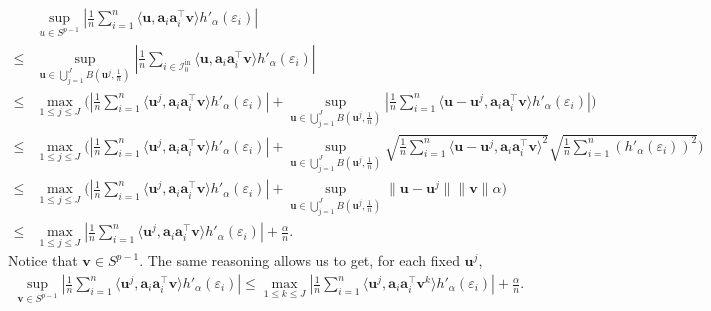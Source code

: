 \documentclass{article}
\numberwithin{equation}{section}
\begin{document}
\begin{equation}
	\begin{aligned}
		&\sup_{u\in S^{p-1}}|\frac{1}{n}\sum_{i=1}^n \langle \mathbf{u}, \mathbf{a}_i\mathbf{a}_i^\top\mathbf{v}\rangle h'_{\alpha}(\varepsilon_i)| \\
		\leq&\sup_{\mathbf{u}\in\bigcup_{j=1}^{J}B\left( \mathbf{u}^j,\frac{1}{n}\right)}|\frac{1}{n}\sum_{i\in\mathcal{I}_{0}^{\mathrm{in}}}\langle \mathbf{u}, \mathbf{a}_i\mathbf{a}_i^\top\mathbf{v}\rangle h'_{\alpha}(\varepsilon_i)| \\
		\leq&\max_{1\leq j\leq J}\Big(|\frac{1}{n}\sum_{i=1}^n \langle \mathbf{u}^j, \mathbf{a}_i\mathbf{a}_i^\top\mathbf{v}\rangle h'_{\alpha}(\varepsilon_i)|
		+\sup_{\mathbf{u}\in\bigcup_{j=1}^{J}B\left( \mathbf{u}^j,\frac{1}{n}\right)}|\frac{1}{n}\sum_{i=1}^n \langle \mathbf{u}-\mathbf{u}^j, \mathbf{a}_i\mathbf{a}_i^\top\mathbf{v}\rangle h'_{\alpha}(\varepsilon_i)|\Big) \\
		\leq&\max_{1\leq j\leq J}\Big(|\frac{1}{n}\sum_{i=1}^n \langle \mathbf{u}^j, \mathbf{a}_i\mathbf{a}_i^\top\mathbf{v}\rangle h'_{\alpha}(\varepsilon_i)|
		+\sup_{\mathbf{u}\in\bigcup_{j=1}^{J}B\left( \mathbf{u}^j,\frac{1}{n}\right)}\sqrt{\frac{1}{n}\sum_{i=1}^n  \langle \mathbf{u}-\mathbf{u}^j, \mathbf{a}_i\mathbf{a}_i^\top\mathbf{v}\rangle^2}\sqrt{\frac{1}{n}\sum_{i=1}^n   ( h'_{\alpha}(\varepsilon_i))^2}\Big) \\
		\leq&\max_{1\leq j\leq J}\Big(|\frac{1}{n}\sum_{i=1}^n \langle \mathbf{u}^j, \mathbf{a}_i\mathbf{a}_i^\top\mathbf{v}\rangle h'_{\alpha}(\varepsilon_i)|
		+\sup_{\mathbf{u}\in\bigcup_{j=1}^{J}B\left( \mathbf{u}^j,\frac{1}{n}\right)} \|\mathbf{u}-\mathbf{u}^j\|\|\mathbf{v}\|\alpha\Big) \\
		\leq&\max_{1\leq j\leq J}|\frac{1}{n}\sum_{i=1}^n \langle \mathbf{u}^j, \mathbf{a}_i\mathbf{a}_i^\top\mathbf{v}\rangle h'_{\alpha}(\varepsilon_i)|
		+\frac{\alpha}{n}.\nonumber
	\end{aligned}
\end{equation}
Notice that $\mathbf{v}\in S^{p-1}$. The same reasoning allows us to get, for each fixed $\mathbf{u}^j$,
\begin{equation}
	\begin{aligned}
		\sup_{\mathbf{v}\in S^{p-1}}|\frac{1}{n}\sum_{i=1}^n \langle \mathbf{u}^j, \mathbf{a}_i\mathbf{a}_i^\top\mathbf{v}\rangle h'_{\alpha}(\varepsilon_i)|
		\leq\max_{1\leq k\leq J}|\frac{1}{n}\sum_{i=1}^n \langle \mathbf{u}^j, \mathbf{a}_i\mathbf{a}_i^\top\mathbf{v}^k\rangle h'_{\alpha}(\varepsilon_i)|
		+\frac{\alpha}{n}. \nonumber
	\end{aligned}
\end{equation}
\end{document}

